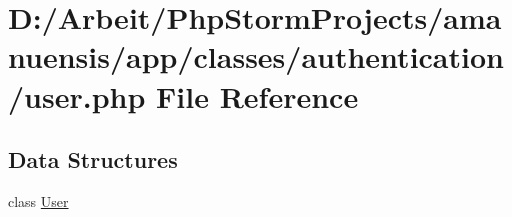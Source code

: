 \hypertarget{a00085}{}\section{D\+:/\+Arbeit/\+Php\+Storm\+Projects/amanuensis/app/classes/authentication/user.php File Reference}
\label{a00085}
\subsection*{Data Structures}
\begin{DoxyCompactItemize}
\item 
class \hyperlink{a00049}{User}
\end{DoxyCompactItemize}
